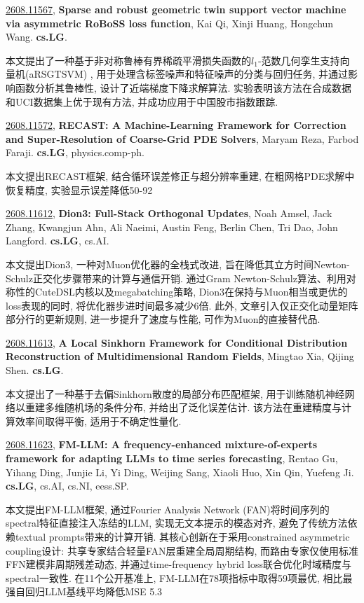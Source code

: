 \documentclass[9pt, a4paper]{article}
\theoremstyle{plain}
\theoremstyle{definition}
\theoremstyle{remark}
\newcommand{\arxivwithtarget}[3]{\hypertarget{#1}{}\href{https://arxiv.org/abs/#1}{#1}, \textbf{\textcolor{arxivblue}{#2}}, #3. }
\begin{document}
\arxivwithtarget{2608.11567}{Sparse and robust geometric twin support vector machine via asymmetric RoBoSS loss function}{Kai Qi, Xinji Huang, Hongchun Wang}\textbf{cs.LG}.

本文提出了一种基于非对称鲁棒有界稀疏平滑损失函数的$l_1$-范数几何孪生支持向量机(aRSGTSVM) , 用于处理含标签噪声和特征噪声的分类与回归任务, 并通过影响函数分析其鲁棒性, 设计了近端梯度下降求解算法. 实验表明该方法在合成数据和UCI数据集上优于现有方法, 并成功应用于中国股市指数跟踪.


\arxivwithtarget{2608.11572}{RECAST: A Machine-Learning Framework for Correction and Super-Resolution of Coarse-Grid PDE Solvers}{Maryam Reza, Farbod Faraji}\textbf{cs.LG}, physics.comp-ph.

本文提出RECAST框架, 结合循环误差修正与超分辨率重建, 在粗网格PDE求解中恢复精度, 实验显示误差降低50-92%


\arxivwithtarget{2608.11612}{Dion3: Full-Stack Orthogonal Updates}{Noah Amsel, Jack Zhang, Kwangjun Ahn, Ali Naeimi, Austin Feng, Berlin Chen, Tri Dao, John Langford}\textbf{cs.LG}, cs.AI.

本文提出Dion3, 一种对Muon优化器的全栈式改进, 旨在降低其立方时间Newton-Schulz正交化步骤带来的计算与通信开销. 通过Gram Newton-Schulz算法、利用对称性的CuteDSL内核以及megabatching策略, Dion3在保持与Muon相当或更优的loss表现的同时, 将优化器步进时间最多减少6倍. 此外, 文章引入仅正交化动量矩阵部分行的更新规则, 进一步提升了速度与性能, 可作为Muon的直接替代品.


\arxivwithtarget{2608.11613}{A Local Sinkhorn Framework for Conditional Distribution Reconstruction of Multidimensional Random Fields}{Mingtao Xia, Qijing Shen}\textbf{cs.LG}.

本文提出了一种基于去偏Sinkhorn散度的局部分布匹配框架, 用于训练随机神经网络以重建多维随机场的条件分布, 并给出了泛化误差估计. 该方法在重建精度与计算效率间取得平衡, 适用于不确定性量化.


\arxivwithtarget{2608.11623}{FM-LLM: A frequency-enhanced mixture-of-experts framework for adapting LLMs to time series forecasting}{Rentao Gu, Yihang Ding, Junjie Li, Yi Ding, Weijing Sang, Xiaoli Huo, Xin Qin, Yuefeng Ji}\textbf{cs.LG}, cs.AI, cs.NI, eess.SP.

本文提出FM-LLM框架, 通过Fourier Analysis Network (FAN)将时间序列的spectral特征直接注入冻结的LLM, 实现无文本提示的模态对齐, 避免了传统方法依赖textual prompts带来的计算开销. 其核心创新在于采用constrained asymmetric coupling设计: 共享专家结合轻量FAN层重建全局周期结构, 而路由专家仅使用标准FFN建模非周期残差动态, 并通过time-frequency hybrid loss联合优化时域精度与spectral一致性. 在11个公开基准上, FM-LLM在78项指标中取得59项最优, 相比最强自回归LLM基线平均降低MSE 5.3%
\end{document}
